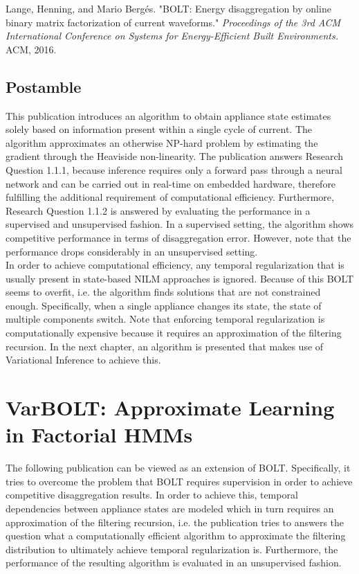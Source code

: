 \documentclass[11pt]{cmuthesis} %
\begin{document}
Lange, Henning, and Mario Bergés. "BOLT: Energy disaggregation by online binary matrix factorization of current waveforms." \emph{Proceedings of the 3rd ACM International Conference on Systems for Energy-Efficient Built Environments.} ACM, 2016.



\section{Postamble}
This publication introduces an algorithm to obtain appliance state estimates solely based on information present within a single cycle of current. The algorithm approximates an otherwise NP-hard problem by estimating the gradient through the Heaviside non-linearity. The publication answers Research Question 1.1.1, because inference requires only a forward pass through a neural network and can be carried out in real-time on embedded hardware, therefore fulfilling the additional requirement of computational efficiency. Furthermore, Research Question 1.1.2 is answered by evaluating the performance in a supervised and unsupervised fashion. In a supervised setting, the algorithm shows competitive performance in terms of disaggregation error. However, note that the performance drops considerably in an unsupervised setting.\\
In order to achieve computational efficiency, any temporal regularization that is usually present in state-based NILM approaches is ignored. Because of this BOLT seems to overfit, i.e. the algorithm finds solutions that are not constrained enough. Specifically, when a single appliance changes its state, the state of multiple components switch. Note that enforcing temporal regularization is computationally expensive because it requires an approximation of the filtering recursion. In the next chapter, an algorithm is presented that makes use of Variational Inference to achieve this.

\chapter{VarBOLT: Approximate Learning in Factorial HMMs}
The following publication can be viewed as an extension of BOLT. Specifically, it tries to overcome the problem that BOLT requires supervision in order to achieve competitive disaggregation results. In order to achieve this, temporal dependencies between appliance states are modeled which in turn requires an approximation of the filtering recursion, i.e. the publication tries to answers the question what a computationally efficient algorithm to approximate the filtering distribution to ultimately achieve temporal regularization is. Furthermore, the performance of the resulting algorithm is evaluated in an unsupervised fashion.
\end{document}
